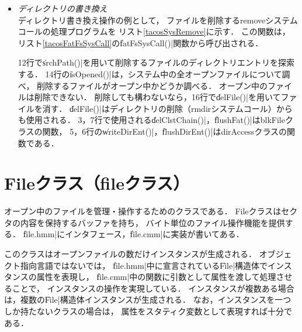 \begin{itemize}
  

  2行の\|chkIdx()|はプロセスのファイルディスクリプタ番号から，
  Fileクラスのオブジェクトを求める．
  6行は作成後まだクラスタが割当てられていないファイルの処理である．
  11〜15行ではFileクラスの\|getByteFile()|を用いて，
  ファイルオブジェクトを通してファイルのデータを\|buf[]|に読み出している．

\item \emph{ディレクトリの書き換え} \\
  ディレクトリ書き換え操作の例として，
  ファイルを削除するremoveシステムコールの処理プログラムを
  リスト\ref{tacosSysRemove}に示す．
  この関数は，
  リスト\ref{tacosFatFsSysCall}の\|fatFsSysCall()|関数から呼び出される．

  12行で\|srchPath()|を用いて削除するファイルのディレクトリエントリを探索する．
  14行の\|isOpened()|は，システム中の全オープンファイルについて調べ，
  削除するファイルがオープン中かどうか調べる．
  オープン中のファイルは削除できない．
  削除しても構わないなら，16行で\|delFile()|を用いてファイルを消す．
  \|delFile()|はディレクトリの削除（rmdirシステムコール）からも使用される．
  3，7行で使用される\|delClstChain()|，\|flushFat()|はblkFileクラスの関数，
  5，6行の\|writeDirEnt()|，\|flushDirEnt()|はdirAccessクラスの関数である．

  

\end{itemize}

\section{Fileクラス（fileクラス）}
オープン中のファイルを管理・操作するためのクラスである．
Fileクラスはセクタの内容を保持するバッファを持ち，
バイト単位のファイル操作機能を提供する．
\|file.hmm|にインタフェース，\|file.cmm|に実装が書いてある．

このクラスはオープンファイルの数だけインスタンスが生成される．
オブジェクト指向言語ではない{\cmm}では，
\|file.hmm|中に宣言されている\|File|構造体でインスタンスの属性を表現し，
\|file.cmm|中の関数に引数として属性を渡して処理させることで，
インスタンスの操作を実現している．
インスタンスが複数ある場合は，複数の\|File|構造体インスタンスが生成される．
なお，インスタンスを一つしか持たないクラスの場合は，
属性をスタティク変数として表現すれば十分である．

